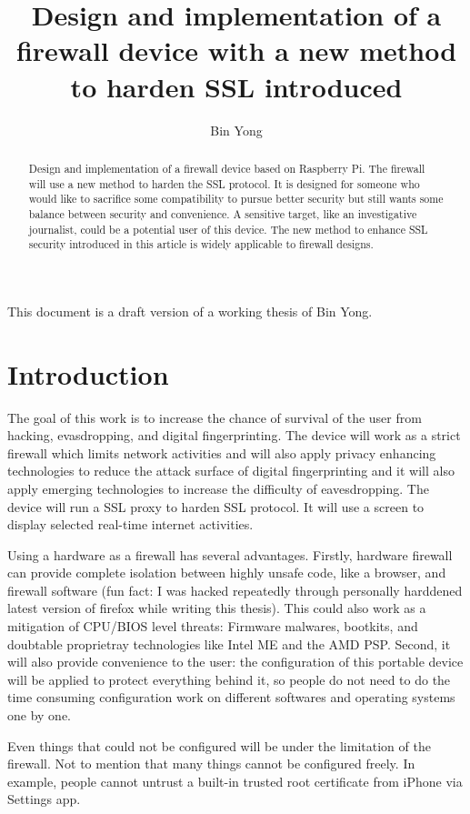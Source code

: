 \documentclass[mscthesis]{usiinfthesis}
\title{Design and implementation of a firewall device with a new method to harden SSL introduced} %
\author{Bin Yong} %
\begin{document}
\maketitle %

\frontmatter %

\begin{abstract}
  Design and implementation of a firewall device based on Raspberry Pi.
  The firewall will use a new method to harden the SSL protocol. It is 
  designed for someone who would like to sacrifice some compatibility 
  to pursue better security but still wants some balance between 
  security and convenience. A sensitive target, like an investigative 
  journalist, could be a potential user of this device. The new method
  to enhance SSL security introduced in this article is widely 
  applicable to firewall designs.

\end{abstract}

\begin{acknowledgements}
  This document is a draft version of a working thesis of Bin Yong.
\end{acknowledgements}

\tableofcontents 
\listoffigures %
\listoftables %

\mainmatter

\chapter{Introduction}
The goal of this work is to increase the chance of survival of the user 
from hacking, evasdropping, and digital fingerprinting. The device will 
work as a strict firewall which limits network activities and will also
apply privacy enhancing technologies to reduce the attack surface of 
digital fingerprinting and it will also apply emerging technologies to 
increase the difficulty of eavesdropping. The device will run a SSL proxy 
to harden SSL protocol. It will use a screen to display selected real-time 
internet activities.\par
Using a hardware as a firewall has several advantages. Firstly, hardware 
firewall can provide complete isolation between highly unsafe code, 
like a browser, and firewall software (fun fact: I was hacked repeatedly 
through personally harddened latest version of firefox while writing this 
thesis). This could also work as a mitigation of CPU/BIOS level threats: 
Firmware malwares, bootkits, and doubtable proprietray technologies like 
Intel ME and the AMD PSP. Second, it will also provide convenience to the 
user: the configuration of this portable device will be applied to protect 
everything behind it, so people do not need to do the time consuming 
configuration work on different softwares and operating systems one by one. \par
Even things that could not be configured will be under the limitation of 
the firewall. Not to mention that many things cannot be configured freely.
In example, people cannot untrust a built-in trusted root certificate from 
iPhone via Settings app.
\end{document}
